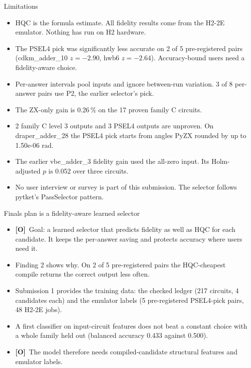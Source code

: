 \documentclass[aspectratio=169,11pt]{beamer}
\newcommand{\Otag}{{\color{opinion}\textbf{[O]}}}
\begin{document}
\begin{frame}{Limitations}
  \small
  \begin{itemize}\setlength{\itemsep}{3pt}
    \item HQC is the formula estimate. All fidelity results come from the H2-2E emulator. Nothing has run on H2 hardware.
    \item The PSEL4 pick was significantly less accurate on 2 of 5 pre-registered pairs (cdkm\_adder\_10 $z = -2.90$, hwb6 $z = -2.64$). Accuracy-bound users need a fidelity-aware choice.
    \item Per-answer intervals pool inputs and ignore between-run variation. 3 of 8 per-answer pairs use P2, the earlier selector's pick.
    \item The ZX-only gain is 0.26\,\% on the 17 proven family C circuits.
    \item 2 family C level 3 outputs and 3 PSEL4 outputs are unproven. On draper\_adder\_28 the PSEL4 pick starts from angles PyZX rounded by up to 1.50e-06 rad.
    \item The earlier vbe\_adder\_3 fidelity gain used the all-zero input. Its Holm-adjusted $p$ is 0.052 over three circuits.
    \item No user interview or survey is part of this submission. The selector follows pytket's PassSelector pattern.
  \end{itemize}
\end{frame}

\begin{frame}{Finals plan is a fidelity-aware learned selector}
  \small
  \begin{itemize}\setlength{\itemsep}{5pt}
    \item \Otag\ Goal: a learned selector that predicts fidelity as well as HQC for each candidate. It keeps the per-answer saving and protects accuracy where users need it.
    \item Finding 2 shows why. On 2 of 5 pre-registered pairs the HQC-cheapest compile returns the correct output less often.
    \item Submission 1 provides the training data: the checked ledger (217 circuits, 4 candidates each) and the emulator labels (5 pre-registered PSEL4-pick pairs, 48 H2-2E jobs).
    \item A first classifier on input-circuit features does not beat a constant choice with a whole family held out (balanced accuracy 0.433 against 0.500).
    \item \Otag\ The model therefore needs compiled-candidate structural features and emulator labels.
  \end{itemize}
\end{frame}
\end{document}

